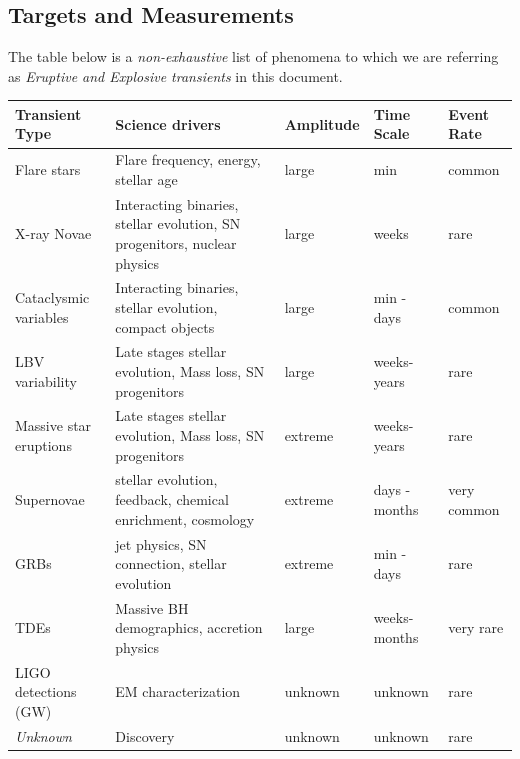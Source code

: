 \subsection{Targets and Measurements}
\label{sec:\chpname:targets}

The table below is a \emph{non-exhaustive} list of
phenomena to which we are referring as \emph{Eruptive and Explosive
  transients} in this document.

\begin{center}
  \begin{tabular}{| p{4.0cm} | p{4.0cm} | l | l | p{1.5cm}|}
    \hline

    Transient Type & Science drivers & Amplitude & Time Scale & Event Rate\\
\hline

Flare stars & Flare frequency, energy, stellar age & large & min & common\\

X-ray Novae & Interacting binaries, stellar evolution, SN progenitors,
nuclear physics & large & weeks & rare\\

Cataclysmic variables & Interacting binaries, stellar evolution, compact
objects & large & min - days & common\\

LBV variability & Late stages stellar evolution, Mass loss, SN progenitors
& large & weeks-years & rare \\

Massive star eruptions & Late stages stellar evolution, Mass loss, SN progenitors & extreme & weeks-years & rare\\

Supernovae & stellar evolution, feedback, chemical enrichment, cosmology & extreme & days - months & very common\\

GRBs & jet physics, SN connection, stellar evolution & extreme & min - days
& rare\\

TDEs & Massive BH demographics, accretion physics & large & weeks-months & very rare\\


LIGO detections (GW) & EM characterization & unknown & unknown & rare\\

\emph{Unknown} & Discovery & unknown & unknown & rare\\

 \hline \end{tabular}
\end{center}

